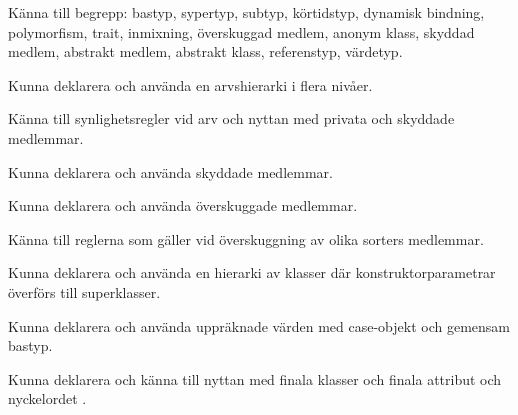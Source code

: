 

\item Känna till begrepp:
bastyp,
sypertyp,
subtyp,
körtidstyp,
dynamisk bindning,
polymorfism,
trait,
inmixning,
överskuggad medlem,
anonym klass,
skyddad medlem,
abstrakt medlem,
abstrakt klass,
referenstyp,
värdetyp.

\item Kunna deklarera och använda en arvshierarki i flera nivåer.

\item Känna till synlighetsregler vid arv och nyttan med privata och skyddade medlemmar.

\item Kunna deklarera och använda skyddade medlemmar.

\item Kunna deklarera och använda överskuggade medlemmar.

\item Känna till reglerna som gäller vid överskuggning av olika sorters medlemmar.

\item Kunna deklarera och använda en hierarki av klasser där konstruktorparametrar överförs till superklasser.

\item Kunna deklarera och använda uppräknade värden med case-objekt och gemensam bastyp.

\item Kunna deklarera och känna till nyttan med finala klasser och finala attribut och nyckelordet .





